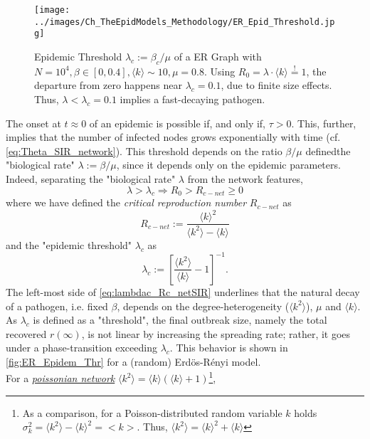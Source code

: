 \documentclass[a4paper,10pt,twoside]{book} %
\theoremstyle{definition}
\begin{document}
\begin{figure}[t]
	\texttt{[image: ../images/Ch\_TheEpidModels\_Methodology/ER\_Epid\_Threshold.jpg]}
	\centering
	\caption{Epidemic Threshold $\lambda_c := \beta_c / \mu$ of a ER Graph with $N = 10^{4}, \beta \in [0,0.4], \langle k \rangle \sim 10, \mu = 0.8$. Using $ R_0 = \lambda \cdot \langle k \rangle \stackrel{!}{=}1$, the departure from zero happens near $\lambda_c = 0.1$, due to finite size effects. Thus, $\lambda < \lambda_c = 0.1$ implies a fast-decaying pathogen.}
	\label{fig:ER_Epidem_Thr}
\end{figure}

The onset at $t \approx 0$  of an epidemic is possible if, and only if, $\tau > 0$. This, further, implies that the number of infected nodes grows exponentially with time (cf. \autoref{eq:Theta_SIR_network}). This threshold depends on the ratio $\beta / \mu$ definedthe "biological rate" $ \lambda := \beta/ \mu$, since it depends only on the epidemic parameters.  
Indeed, separating the "biological rate" $\lambda$ from the network features, 
\begin{equation}
	\lambda > 
	\lambda_c
	\Rightarrow
	R_0 > R_{c-net} \geq 0
	\label{eq:lambdac_Rc_netSIR}
\end{equation}
where we have defined the \textit{critical reproduction number}  $ R_{c-net}$ as
\begin{equation}
	R_{c-net} := \frac{ \langle k \rangle^2 }{\langle k^2 \rangle-\langle k \rangle}
	\label{eq:def_R_cnet}
\end{equation}
and the "epidemic threshold" $ \lambda_c$ as
\begin{equation}
	\lambda_c:=\left[ \frac{\langle k^2 \rangle}{\langle k \rangle} - 1\right]^{-1}.
	\label{eq:def_lambdac}
\end{equation}
The left-most side of \autoref{eq:lambdac_Rc_netSIR} underlines that the natural decay of a pathogen, i.e. fixed $ \beta$, depends on the degree-heterogeneity ($\langle k^2 \rangle$), $ \mu$  and $\langle k \rangle$. \\ 
As $\lambda_c$ is defined as a "threshold", the final outbreak size, namely the total recovered $r(\infty)$, is not linear by increasing the spreading rate; rather, it goes under a phase-transition exceeding $\lambda_c$. This behavior is shown in \autoref{fig:ER_Epidem_Thr} for a (random) Erdös-Rényi model. 
\\For a \underline{\textit{poissonian network}} $\langle k^2 \rangle = \langle k \rangle (\langle k \rangle + 1 )$\footnote{As a comparison, for a Poisson-distributed random variable $k$ holds $\sigma_k^2 = \langle k^2 \rangle - \langle k \rangle^2 = <k>$. Thus, $\langle k^2 \rangle = \langle k \rangle^2 + \langle k \rangle$}, 
\end{document}
